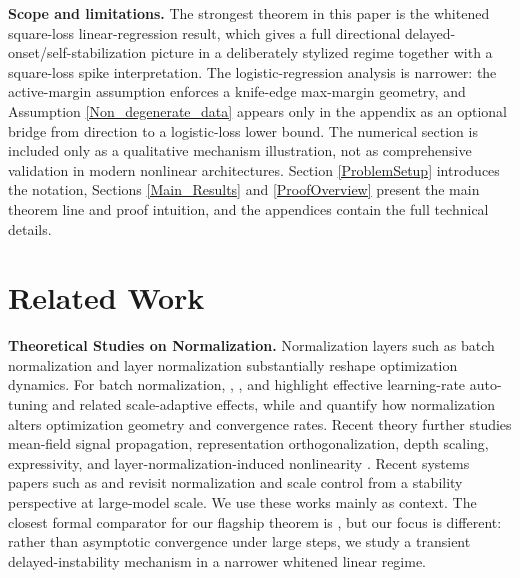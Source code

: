 \documentclass[pdflatex,sn-basic]{sn-jnl}%
\theoremstyle{thmstyleone}%
\begin{document}
\noindent\textbf{Scope and limitations.}
The strongest theorem in this paper is the whitened square-loss linear-regression result, which gives a full directional delayed-onset/self-stabilization picture in a deliberately stylized regime together with a square-loss spike interpretation. The logistic-regression analysis is narrower: the active-margin assumption enforces a knife-edge max-margin geometry, and Assumption \ref{Non_degenerate_data} appears only in the appendix as an optional bridge from direction to a logistic-loss lower bound. The numerical section is included only as a qualitative mechanism illustration, not as comprehensive validation in modern nonlinear architectures. Section \ref{ProblemSetup} introduces the notation, Sections \ref{Main_Results} and \ref{ProofOverview} present the main theorem line and proof intuition, and the appendices contain the full technical details.


\section{Related Work}

\noindent\textbf{Theoretical Studies on Normalization.}  
Normalization layers such as batch normalization \citep{BN} and layer normalization \citep{LN} substantially reshape optimization dynamics. For batch normalization, \citet{arora2018theoretical}, \citet{hoffer2018norm}, and \citet{morwani2022inductive} highlight effective learning-rate auto-tuning and related scale-adaptive effects, while \citet{kohler2019exponential} and \citet{cai2019quantitative} quantify how normalization alters optimization geometry and convergence rates. Recent theory further studies mean-field signal propagation, representation orthogonalization, depth scaling, expressivity, and layer-normalization-induced nonlinearity \citep{yang2019mean_field_bn,daneshmand2021bn_orthogonalizes,meterez2024bn_without_gradient_explosion,burkholz2024bn_universal,ni2024layernorm_nonlinearity}. Recent systems papers such as \citet{wang2025sdd} and \citet{zhuo2025hybridnorm} revisit normalization and scale control from a stability perspective at large-model scale. We use these works mainly as context. The closest formal comparator for our flagship theorem is \citet{arora2018theoretical}, but our focus is different: rather than asymptotic convergence under large steps, we study a transient delayed-instability mechanism in a narrower whitened linear regime.
\end{document}
